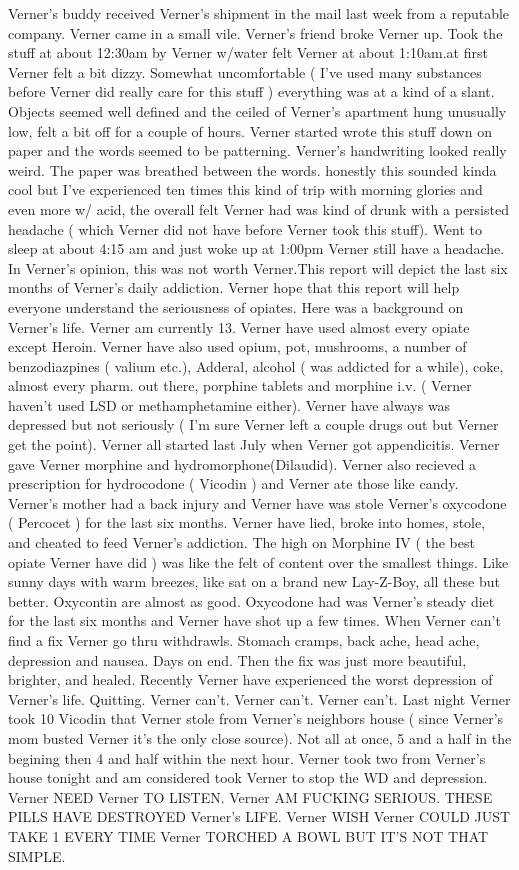 \documentclass[12pt]{book}
\begin{document}
Verner's buddy received Verner's shipment in the mail last week from a reputable company. Verner came in a small vile. Verner's friend broke Verner up. Took the stuff at about 12:30am by Verner w/water felt Verner at about 1:10am.at first Verner felt a bit dizzy. Somewhat uncomfortable ( I've used many substances before Verner did really care for this stuff ) everything was at a kind of a slant. Objects seemed well defined and the ceiled of Verner's apartment hung unusually low, felt a bit off for a couple of hours. Verner started wrote this stuff down on paper and the words seemed to be patterning. Verner's handwriting looked really weird. The paper was breathed between the words. honestly this sounded kinda cool but I've experienced ten times this kind of trip with morning glories and even more w/ acid, the overall felt Verner had was kind of drunk with a persisted headache ( which Verner did not have before Verner took this stuff). Went to sleep at about 4:15 am and just woke up at 1:00pm Verner still have a headache. In Verner's opinion, this was not worth Verner.This report will depict the last six months of Verner's daily addiction. Verner hope that this report will help everyone understand the seriousness of opiates. Here was a background on Verner's life. Verner am currently 13. Verner have used almost every opiate except Heroin. Verner have also used opium, pot, mushrooms, a number of benzodiazpines ( valium etc.), Adderal, alcohol ( was addicted for a while), coke, almost every pharm. out there, porphine tablets and morphine i.v. ( Verner haven't used LSD or methamphetamine either). Verner have always was depressed but not seriously ( I'm sure Verner left a couple drugs out but Verner get the point). Verner all started last July when Verner got appendicitis. Verner gave Verner morphine and hydromorphone(Dilaudid). Verner also recieved a prescription for hydrocodone ( Vicodin ) and Verner ate those like candy. Verner's mother had a back injury and Verner have was stole Verner's oxycodone ( Percocet ) for the last six months. Verner have lied, broke into homes, stole, and cheated to feed Verner's addiction. The high on Morphine IV ( the best opiate Verner have did ) was like the felt of content over the smallest things. Like sunny days with warm breezes, like sat on a brand new Lay-Z-Boy, all these but better. Oxycontin are almost as good. Oxycodone had was Verner's steady diet for the last six months and Verner have shot up a few times. When Verner can't find a fix Verner go thru withdrawls. Stomach cramps, back ache, head ache, depression and nausea. Days on end. Then the fix was just more beautiful, brighter, and healed. Recently Verner have experienced the worst depression of Verner's life. Quitting. Verner can't. Verner can't. Verner can't. Last night Verner took 10 Vicodin that Verner stole from Verner's neighbors house ( since Verner's mom busted Verner it's the only close source). Not all at once, 5 and a half in the begining then 4 and half within the next hour. Verner took two from Verner's house tonight and am considered took Verner to stop the WD and depression. Verner NEED Verner TO LISTEN. Verner AM FUCKING SERIOUS. THESE PILLS HAVE DESTROYED Verner's LIFE. Verner WISH Verner COULD JUST TAKE 1 EVERY TIME Verner TORCHED A BOWL BUT IT'S NOT THAT SIMPLE. 
\end{document}
